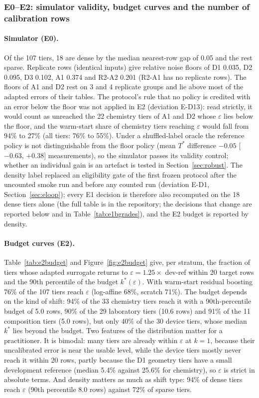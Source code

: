 \documentclass[11pt,a4paper]{article}
\begin{document}
\subsubsection{E0--E2: simulator validity, budget curves and the number of calibration rows}
\label{sec:e2}
\paragraph{Simulator (E0).} Of the 107 tiers, 18 are dense by the
median nearest-row gap of 0.05 and the rest sparse. Replicate rows (identical inputs)
give relative noise floors of D1 0.035, D2 0.095, D3 0.102, A1 0.374 and R2-A2 0.201 (R2-A1 has no
replicate rows). The floors of A1 and D2 rest on 3 and 4 replicate groups and lie above most of the
adapted errors of their tables. The protocol's rule that no policy is credited with an error below the
floor was not applied in E2 (deviation E-D13): read strictly, it would count as unreached the 22
chemistry tiers of A1 and D2 whose $\varepsilon$ lies below the floor, and the warm-start share of
chemistry tiers reaching $\varepsilon$ would fall from 94\% to 27\% (all tiers: 76\% to 55\%).
Under a shuffled-label oracle the reference policy is not distinguishable from the floor policy (mean
$T^{*}$ difference $-0.05$ [$-0.63$, $+0.38$] measurements), so the simulator passes its validity
control; whether an individual gain is an artefact is tested in Section~\ref{sec:robust}. The density label replaced an eligibility gate of the
first frozen protocol after the uncounted smoke run and before any counted run (deviation E-D1,
Section~\ref{sec:eloop}); every E1 decision is therefore also recomputed on the 18 dense tiers alone
(the full table is in the repository; the decisions that change are reported below and in
Table~\ref{tab:e1bgrades}), and the E2 budget is reported by density.

\paragraph{Budget curves (E2).} Table~\ref{tab:e2budget} and Figure~\ref{fig:e2budget} give, per stratum, the fraction of tiers
whose adapted surrogate returns to $\varepsilon = 1.25 \times$ dev-ref within 20 target rows and the
90th percentile of the budget $k^{*}(\varepsilon)$. With warm-start residual boosting
76\% of the 107 tiers reach $\varepsilon$ (log-affine
68\%, scratch 71\%). The budget depends on the kind of shift:
94\% of the 33 chemistry tiers reach it with a 90th-percentile budget of
5.0 rows, 90\% of the 29 laboratory tiers
(10.6 rows) and 91\% of the 11 composition
tiers (5.0 rows), but only 40\% of the 30 device tiers,
whose median $k^{*}$ lies beyond the budget. Two features of the distribution matter for a
practitioner. It is bimodal: many tiers are already within $\varepsilon$ at $k = 1$, because their
uncalibrated error is near the usable level, while the device tiers mostly never reach it within
20 rows, partly because the D1 geometry tiers have a small development reference (median
5.4\% against 25.6\% for chemistry), so $\varepsilon$ is strict in absolute terms.
And density matters as much as shift type: 94\% of dense tiers reach $\varepsilon$
(90th percentile 8.0 rows) against 72\% of sparse tiers.
\end{document}
